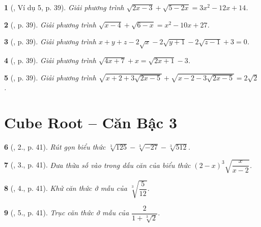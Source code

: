 \documentclass{article}
\newtheorem{baitoan}{}
\begin{document}
\begin{baitoan}[\cite{Binh_boi_duong_Toan_9_tap_1}, Ví dụ 5, p. 39]
	Giải phương trình $\sqrt{2x - 3} + \sqrt{5 - 2x} = 3x^2 - 12x + 14$.
\end{baitoan}

\begin{baitoan}[\cite{Binh_boi_duong_Toan_9_tap_1}, p. 39]
	Giải phương trình $\sqrt{x - 4} + \sqrt{6 - x} = x^2 - 10x + 27$.
\end{baitoan}

\begin{baitoan}[\cite{Binh_boi_duong_Toan_9_tap_1}, p. 39]
	Giải phương trình $x + y + z - 2\sqrt{x} -2\sqrt{y + 1} - 2\sqrt{z - 1} + 3 = 0$.
\end{baitoan}

\begin{baitoan}[\cite{Binh_boi_duong_Toan_9_tap_1}, p. 39]
	Giải phương trình $\sqrt{4x + 7} + x = \sqrt{2x + 1} - 3$.
\end{baitoan}

\begin{baitoan}[\cite{Binh_boi_duong_Toan_9_tap_1}, p. 39]
	Giải phương trình $\sqrt{x + 2 + 3\sqrt{2x - 5}} + \sqrt{x - 2 - 3\sqrt{2x - 5}} = 2\sqrt{2}$.
\end{baitoan}


\section{Cube Root -- Căn Bậc 3}

\begin{baitoan}[\cite{Binh_boi_duong_Toan_9_tap_1}, 2., p. 41]
	Rút gọn biểu thức $\sqrt[3]{125} - \sqrt[3]{-27} - \sqrt[3]{512}$.
\end{baitoan}

\begin{baitoan}[\cite{Binh_boi_duong_Toan_9_tap_1}, 3., p. 41]
	Đưa thừa số vào trong dấu căn của biểu thức $(2 - x)^3 \sqrt{\dfrac{x}{x - 2}}$.
\end{baitoan}

\begin{baitoan}[\cite{Binh_boi_duong_Toan_9_tap_1}, 4., p. 41]
	Khử căn thức ở mẫu của $\sqrt[3]{\dfrac{5}{12}}$.
\end{baitoan}

\begin{baitoan}[\cite{Binh_boi_duong_Toan_9_tap_1}, 5., p. 41]
	Trục căn thức ở mẫu của $\dfrac{2}{1 + \sqrt[3]{2}}$.
\end{baitoan}
\end{document}
